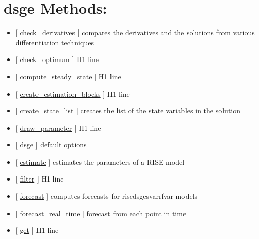 \documentclass[letterpaper,10pt,english]{sphinxmanual}
\begin{document}
\section{dsge Methods:}
\label{classes/models/@dsge/dsge:dsge-methods}\begin{itemize}
\item {} 
{[} {\hyperref[classes/models/@dsge/dsge:check-derivatives]{check\_derivatives}} {]}  compares the derivatives and the solutions from various differentiation techniques

\item {} 
{[} {\hyperref[classes/models/@dsge/dsge:check-optimum]{check\_optimum}} {]}   H1 line

\item {} 
{[} {\hyperref[classes/models/@dsge/dsge:compute-steady-state]{compute\_steady\_state}} {]}   H1 line

\item {} 
{[} {\hyperref[classes/models/@dsge/dsge:create-estimation-blocks]{create\_estimation\_blocks}} {]}   H1 line

\item {} 
{[} {\hyperref[classes/models/@dsge/dsge:create-state-list]{create\_state\_list}} {]} creates the list of the state variables in the solution

\item {} 
{[} {\hyperref[classes/models/@dsge/dsge:draw-parameter]{draw\_parameter}} {]}   H1 line

\item {} 
{[} {\hyperref[classes/models/@dsge/dsge:dsge]{dsge}} {]}   default options

\item {} 
{[} {\hyperref[classes/models/@dsge/dsge:estimate]{estimate}} {]}  estimates the parameters of a RISE model

\item {} 
{[} {\hyperref[classes/models/@dsge/dsge:filter]{filter}} {]}   H1 line

\item {} 
{[} {\hyperref[classes/models/@dsge/dsge:forecast]{forecast}} {]}  computes forecasts for rise\textbar{}dsge\textbar{}svar\textbar{}rfvar models

\item {} 
{[} {\hyperref[classes/models/@dsge/dsge:forecast-real-time]{forecast\_real\_time}} {]}  forecast from each point in time

\item {} 
{[} {\hyperref[classes/models/@dsge/dsge:get]{get}} {]}   H1 line


\end{itemize}
\end{document}
